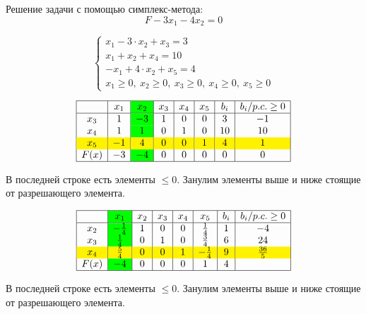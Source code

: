 \documentclass{article}
\begin{document}
Решение задачи с помощью симплекс-метода:
\[
    F - 3x_1 - 4x_2 = 0
\]

\[
    \begin{cases}
        x_1 - 3 \cdot x_2 + x_3 = 3  \\
        x_1 + x_2 + x_4 = 10         \\
        -x_1 + 4 \cdot x_2 + x_5 = 4 \\
        x_1 \geq 0, \ x_2 \geq 0, \ x_3 \geq 0, \ x_4 \geq 0, \ x_5 \geq 0
    \end{cases}
\]

\vspace{25pt}

\[
    \begin{array}{|c|c|>{\columncolor{green}}c|c|c|c|c|c|}
        \hline
             & x_1 & x_2 & x_3 & x_4 & x_5 & b_i & b_i/p.c. \geq 0 \\
        \hline
        x_3  & 1   & -3  & 1   & 0   & 0   & 3   & -1              \\
        x_4  & 1   & 1   & 0   & 1   & 0   & 10  & 10              \\
        \rowcolor{yellow}
        x_5  & -1  & 4   & 0   & 0   & 1   & 4   & 1               \\
        F(x) & -3  & -4  & 0   & 0   & 0   & 0   & 0               \\
        \hline
    \end{array}
\]

В последней строке есть элементы \(\leq 0\). Занулим элементы выше и ниже стоящие от разрешающего элемента.

\[
    \begin{array}{|c|>{\columncolor{green}}c|c|c|c|c|c|c|}
        \hline
             & x_1          & x_2 & x_3 & x_4 & x_5          & b_i & b_i/p.c. \geq 0 \\
        \hline
        x_2  & -\frac{1}{4} & 1   & 0   & 0   & \frac{1}{4}  & 1   & -4              \\
        x_3  & \frac{1}{4}  & 0   & 1   & 0   & \frac{3}{4}  & 6   & 24              \\
        \rowcolor{yellow}
        x_4  & \frac{5}{4}  & 0   & 0   & 1   & -\frac{1}{4} & 9   & \frac{36}{5}    \\
        F(x) & -4           & 0   & 0   & 0   & 1            & 4   &                 \\
        \hline
    \end{array}
\]

В последней строке есть элементы \(\leq 0\). Занулим элементы выше и ниже стоящие от разрешающего элемента.
\end{document}
